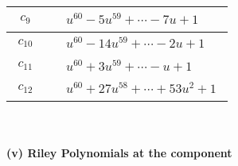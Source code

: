 \documentclass[1p]{elsarticle_modified}
\theoremstyle{definition}
\begin{document}
\begin{tabular}{m{50pt}|m{274pt}}
\hline $$\begin{aligned}c_{9}\end{aligned}$$&$\begin{aligned}
&u^{60}-5 u^{59}+\cdots-7 u+1
\end{aligned}$\\
\hline $$\begin{aligned}c_{10}\end{aligned}$$&$\begin{aligned}
&u^{60}-14 u^{59}+\cdots-2 u+1
\end{aligned}$\\
\hline $$\begin{aligned}c_{11}\end{aligned}$$&$\begin{aligned}
&u^{60}+3 u^{59}+\cdots- u+1
\end{aligned}$\\
\hline $$\begin{aligned}c_{12}\end{aligned}$$&$\begin{aligned}
&u^{60}+27 u^{58}+\cdots+53 u^2+1
\end{aligned}$\\
\hline
\end{tabular}\\~\\
\newpage\renewcommand{\arraystretch}{1}
\flushleft \textbf{(v) Riley Polynomials at the component}\newline \\
\end{document}
